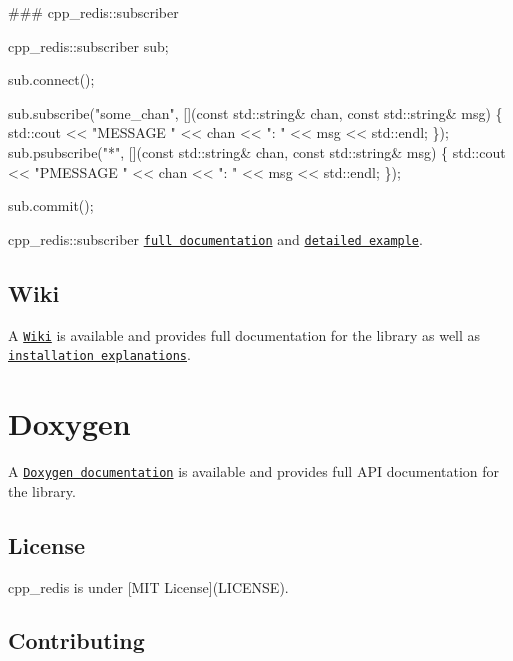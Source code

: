 \#\#\# cpp\+\_\+redis\+::subscriber 
\begin{DoxyCode}
cpp\_redis::subscriber sub;

sub.connect();

sub.subscribe(\textcolor{stringliteral}{"some\_chan"}, [](\textcolor{keyword}{const} std::string& chan, \textcolor{keyword}{const} std::string& msg) \{
  std::cout << \textcolor{stringliteral}{"MESSAGE "} << chan << \textcolor{stringliteral}{": "} << msg << std::endl;
\});
sub.psubscribe(\textcolor{stringliteral}{"*"}, [](\textcolor{keyword}{const} std::string& chan, \textcolor{keyword}{const} std::string& msg) \{
  std::cout << \textcolor{stringliteral}{"PMESSAGE "} << chan << \textcolor{stringliteral}{": "} << msg << std::endl;
\});

sub.commit();
\end{DoxyCode}
 {\ttfamily cpp\+\_\+redis\+::subscriber} \href{https://github.com/Cylix/cpp_redis/wiki/Redis-Subscriber}{\tt full documentation} and \href{https://github.com/Cylix/cpp_redis/wiki/Examples#redis-subscriber}{\tt detailed example}.

\subsection*{Wiki}

A \href{https://github.com/Cylix/cpp_redis/wiki}{\tt Wiki} is available and provides full documentation for the library as well as \href{https://github.com/Cylix/cpp_redis/wiki/Installation}{\tt installation explanations}.

\section*{Doxygen}

A \href{https://cylix.github.io/cpp_redis/html/}{\tt Doxygen documentation} is available and provides full A\+PI documentation for the library.

\subsection*{License}

{\ttfamily cpp\+\_\+redis} is under \mbox{[}M\+IT License\mbox{]}(L\+I\+C\+E\+N\+SE).

\subsection*{Contributing}

